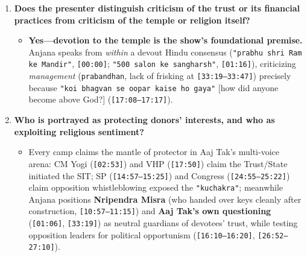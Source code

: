 \documentclass[10pt,a4paper]{article}
\begin{document}
\begin{enumerate}[leftmargin=1.6em, itemsep=4pt, topsep=4pt]
\begin{itemize}[leftmargin=1.4em, itemsep=2pt, topsep=2pt]
  \end{itemize}
  \item \textbf{Does the presenter distinguish criticism of the trust or its financial practices from criticism of the temple or religion itself?}
  \begin{itemize}[leftmargin=1.4em, itemsep=2pt, topsep=2pt]
    \item \textbf{Yes---devotion to the temple is the show's foundational premise.} Anjana speaks from \textit{within} a devout Hindu consensus (\texttt{"prabhu shri Ram ke Mandir"}, \texttt{[00:00]}; \texttt{"500 salon ke sangharsh"}, \texttt{[01:16]}), criticizing \textit{management} (\texttt{prabandhan}, lack of frisking at \texttt{[33:19--33:47]}) precisely because \texttt{"koi bhagvan se oopar kaise ho gaya"} [how did anyone become above God?] (\texttt{[17:08--17:17]}).
  \end{itemize}
  \item \textbf{Who is portrayed as protecting donors' interests, and who as exploiting religious sentiment?}
  \begin{itemize}[leftmargin=1.4em, itemsep=2pt, topsep=2pt]
    \item Every camp claims the mantle of protector in Aaj Tak's multi-voice arena: CM Yogi (\texttt{[02:53]}) and VHP (\texttt{[17:50]}) claim the Trust/State initiated the SIT; SP (\texttt{[14:57--15:25]}) and Congress (\texttt{[24:55--25:22]}) claim opposition whistleblowing exposed the \texttt{"kuchakra"}; meanwhile Anjana positions \textbf{Nripendra Misra} (who handed over keys cleanly after construction, \texttt{[10:57--11:15]}) and \textbf{Aaj Tak's own questioning} (\texttt{[01:06]}, \texttt{[33:19]}) as neutral guardians of devotees' trust, while testing opposition leaders for political opportunism (\texttt{[16:10--16:20]}, \texttt{[26:52--27:10]}).
  \end{itemize}
\end{enumerate}
\end{document}
